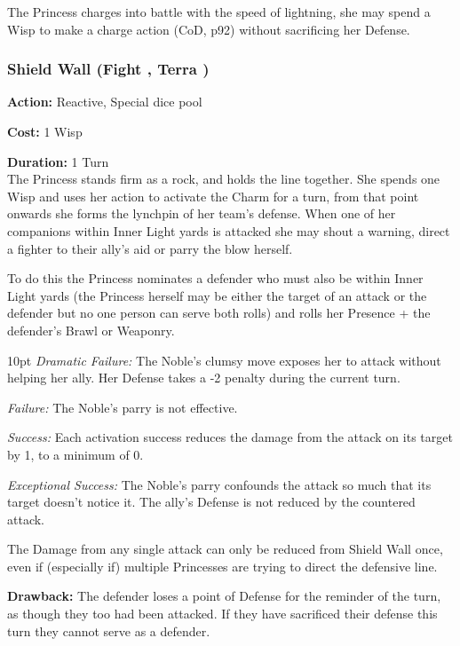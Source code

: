 \noindent The Princess charges into battle with the speed of lightning, she may spend a Wisp to make a charge action (CoD, p92) without sacrificing her Defense.


\subsubsection*{Shield Wall (Fight \textbullet\textbullet, Terra \textbullet)}

\noindent \textbf{Action:} Reactive, Special dice pool

\noindent \textbf{Cost:} 1 Wisp

\noindent \textbf{Duration:} 1 Turn\\

\noindent The Princess stands firm as a rock, and holds the line together. She spends one Wisp and uses her action to activate the Charm for a turn, from that point onwards she forms the lynchpin of her team's defense. When one of her companions within Inner Light yards is attacked she may shout a warning, direct a fighter to their ally's aid or parry the blow herself. 

To do this the Princess nominates a defender who must also be within Inner Light yards (the Princess herself may be either the target of an attack or the defender but no one person can serve both rolls) and rolls her Presence + the defender's Brawl or Weaponry. 

\begin{myindentpar}{10pt} 
\emph{Dramatic Failure:}  The Noble’s clumsy move exposes her to attack without helping her ally. Her Defense takes a -2 penalty during the current turn.

\emph{Failure:} The Noble’s parry is not effective.

\emph{Success:} Each activation success reduces the damage from the attack on its target by 1, to a minimum of 0.

\emph{Exceptional Success:} The Noble’s parry confounds the attack so much that its target doesn’t notice it. The ally’s Defense is not reduced by the countered attack.\end{myindentpar}

The Damage from any single attack can only be reduced from Shield Wall once, even if (especially if) multiple Princesses are trying to direct the defensive line.

\noindent \textbf{Drawback:} The defender loses a point of Defense for the reminder of the turn, as though they too had been attacked. If they have sacrificed their defense this turn they cannot serve as a defender. 


